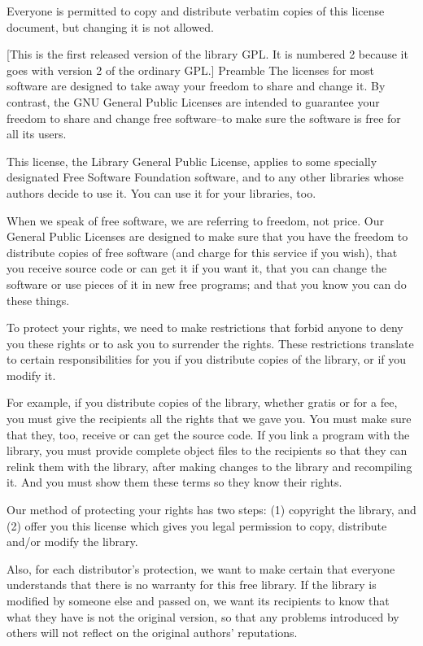 Everyone is permitted to copy and distribute verbatim copies
of this license document, but changing it is not allowed.

[This is the first released version of the library GPL.  It is
numbered 2 because it goes with version 2 of the ordinary GPL.]
Preamble
The licenses for most software are designed to take away your freedom to share and change it. By contrast, the GNU General Public Licenses are intended to guarantee your freedom to share and change free software--to make sure the software is free for all its users. 

This license, the Library General Public License, applies to some specially designated Free Software Foundation software, and to any other libraries whose authors decide to use it. You can use it for your libraries, too. 

When we speak of free software, we are referring to freedom, not price. Our General Public Licenses are designed to make sure that you have the freedom to distribute copies of free software (and charge for this service if you wish), that you receive source code or can get it if you want it, that you can change the software or use pieces of it in new free programs; and that you know you can do these things. 

To protect your rights, we need to make restrictions that forbid anyone to deny you these rights or to ask you to surrender the rights. These restrictions translate to certain responsibilities for you if you distribute copies of the library, or if you modify it. 

For example, if you distribute copies of the library, whether gratis or for a fee, you must give the recipients all the rights that we gave you. You must make sure that they, too, receive or can get the source code. If you link a program with the library, you must provide complete object files to the recipients so that they can relink them with the library, after making changes to the library and recompiling it. And you must show them these terms so they know their rights. 

Our method of protecting your rights has two steps: (1) copyright the library, and (2) offer you this license which gives you legal permission to copy, distribute and/or modify the library. 

Also, for each distributor's protection, we want to make certain that everyone understands that there is no warranty for this free library. If the library is modified by someone else and passed on, we want its recipients to know that what they have is not the original version, so that any problems introduced by others will not reflect on the original authors' reputations. 

